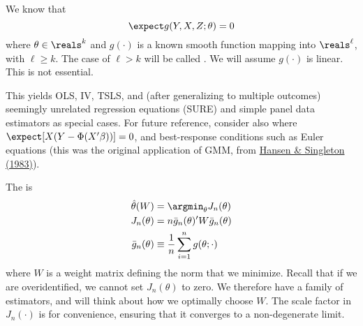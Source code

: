 \documentclass[10pt]{article}
\begin{document}
\begin{definition}
	We know that \[\expect g(Y,X,Z;\theta) = 0\]where $\theta \in \reals^k$ and $g(\cdot)$ is a known smooth function mapping into $\reals^\ell$, with $\ell \ge k$. The case of $\ell > k$ will be called . We will assume $g(\cdot)$ is linear. This is not essential. 
	
	\begin{remark}
		This yields OLS, IV, TSLS, and (after generalizing to multiple outcomes) seemingly unrelated regression equations (SURE) and simple panel data estimators as special cases. For future reference, consider also  where $\expect[X (Y - \Phi(X'\beta))] = 0$, and best-response conditions such as Euler equations (this was the original application of GMM, from \href{https://www.journals.uchicago.edu/doi/abs/10.1086/261141}{Hansen \& Singleton (1983)}).
	\end{remark}
	The  is \begin{align*} \hat{\theta}(W) &= \argmin_{\theta} J_n(\theta) \\ J_n(\theta) &= n \bar{g}_n(\theta)' W \bar{g}_n(\theta) \\ \bar{g}_n(\theta) &\equiv \frac{1}{n}\sum_{i=1}^n g(\theta; \cdot)\end{align*}where $W$ is a weight matrix defining the norm that we minimize. Recall that if we are overidentified, we cannot set $J_n(\theta)$ to zero. We therefore have a family of estimators, and will think about how we optimally choose $W$. The scale factor in $J_n(\cdot)$ is for convenience, ensuring that it converges to a non-degenerate limit.
\end{definition}
\end{document}
